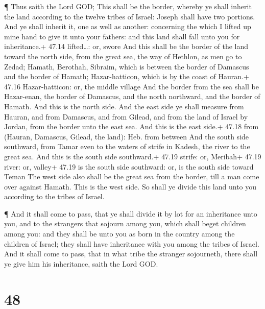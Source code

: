  ¶ Thus saith the Lord GOD; This shall be the border,
whereby ye shall inherit the land according to the twelve tribes of
Israel: Joseph shall have two portions.  And ye shall
inherit it, one as well as another: concerning the which I lifted up
mine hand to give it unto your fathers: and this land shall fall unto
you for inheritance.+ 47.14 lifted\ldots: or, swore  And
this shall be the border of the land toward the north side, from the
great sea, the way of Hethlon, as men go to Zedad;  Hamath,
Berothah, Sibraim, which is between the border of Damascus and the
border of Hamath; Hazar-hatticon, which is by the coast of Hauran.+
47.16 Hazar-hatticon: or, the middle village  And the
border from the sea shall be Hazar-enan, the border of Damascus, and the
north northward, and the border of Hamath. And this is the north side.
 And the east side ye shall measure from Hauran, and from
Damascus, and from Gilead, and from the land of Israel by Jordan, from
the border unto the east sea. And this is the east side.+ 47.18 from
(Hauran, Damascus, Gilead, the land): Heb. from between 
And the south side southward, from Tamar even to the waters of strife in
Kadesh, the river to the great sea. And this is the south side
southward.+ 47.19 strife: or, Meribah+ 47.19 river: or, valley+ 47.19 is
the south side southward: or, is the south side toward Teman
 The west side also shall be the great sea from the border,
till a man come over against Hamath. This is the west side.
 So shall ye divide this land unto you according to the
tribes of Israel.

 ¶ And it shall come to pass, that ye shall divide it by
lot for an inheritance unto you, and to the strangers that sojourn among
you, which shall beget children among you: and they shall be unto you as
born in the country among the children of Israel; they shall have
inheritance with you among the tribes of Israel.  And it
shall come to pass, that in what tribe the stranger sojourneth, there
shall ye give him his inheritance, saith the Lord GOD.

\hypertarget{section-47}{%
\section{48}\label{section-47}}

